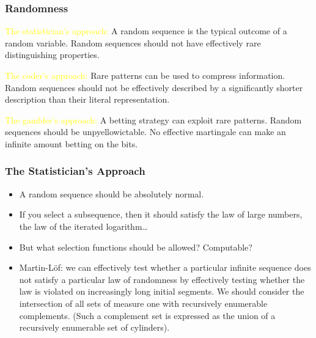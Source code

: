 \documentclass[UTF8,11pt,colorlinks,compress,openany]{beamer}%
\begin{document}
\begin{frame}\frametitle{Randomness}
\begin{description}
	\item[\textcolor{green}{Typicalness}] \textcolor{yellow}{The statistician's approach:} A random sequence is the typical outcome of a random variable. Random sequences should not have effectively rare distinguishing properties.
	\item[\textcolor{green}{Incompressibility}] \textcolor{yellow}{The coder's approach:} Rare patterns can be used to compress information. Random sequences should not be effectively described by a significantly shorter description than their literal representation.
	\item[\textcolor{green}{Unpredictability}] \textcolor{yellow}{The gambler's approach:} A betting strategy can exploit rare patterns. Random sequences should be unpyellowictable. No effective martingale can make an infinite amount betting on the bits.
\end{description}
\end{frame}

\begin{frame}\frametitle{The Statistician's Approach}
\begin{itemize}
	\item A random sequence should be absolutely normal.
	\item If you select a subsequence, then it should satisfy the law of large numbers, the law of the iterated logarithm\dots
	\item But what selection functions should be allowed? Computable?
	\item Martin-L\"of: we can effectively test whether a particular infinite sequence does not satisfy a particular law of randomness by effectively testing whether the law is violated on increasingly long initial segments. We should consider the intersection of all sets of measure one with recursively enumerable complements. (Such a complement set is expressed as the union of a recursively enumerable set of cylinders).
\end{itemize}
\end{frame}
\end{document}
